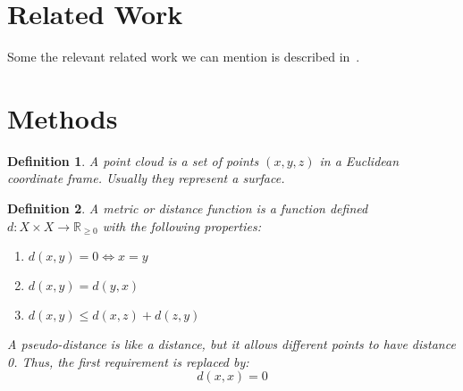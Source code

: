 \documentclass[12pt]{article}
\newtheorem{definition}{Definition}
\newcommand{\contentdescription}[1]{}
\begin{document}
    \section{Related Work}
    \contentdescription{
        Related Work (5-15\%): Discuss the published work related to your project paper, the types of experiments
        you do and the additional method that you have added to this work or you have compared this paper with (if any).
    }

    Some the relevant related work we can mention is described in~\cite{qi2017pointnet}.


    \section{Methods}
    \contentdescription{
        Methods (15-25\%): Describe the original paper's method to the extent that you would need to make your report and findings understandable. Otherwise, here you can describe other methods that you compare with or other methods that you apply on top of what you reimplemented. Here, you also try to justify any methodical modification or incremental changes that you have added to the original paper. It may be helpful to include figures, diagrams, or tables to describe your method or compare it with other methods.
    }

    \begin{definition}
        A \emph{point cloud} is a set of points $(x, y, z)$ in a Euclidean coordinate frame.
        Usually they represent a surface.
    \end{definition}

    \begin{definition}
        A \emph{metric} or \emph{distance function} is a function defined
        $d: X \times X \to \mathbb{R}_{\geq 0}$
        with the following properties:

        \begin{enumerate}
            \item $d(x,y) = 0 \Leftrightarrow x = y$
            \item $d(x,y) = d(y,x)$
            \item $d(x,y) \leq d(x,z) + d(z,y)$
        \end{enumerate}

        A \emph{pseudo-distance} is like a distance, but it allows different points to have distance 0. Thus, the first requirement is replaced by:
        \[d(x,x) = 0\]
    \end{definition}
\end{document}
